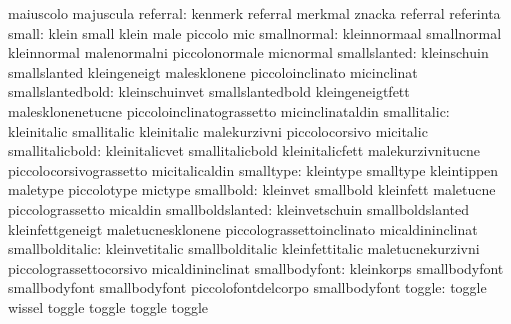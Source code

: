                           maiuscolo                 majuscula
                 referral: kenmerk                   referral
                           merkmal                   znacka
                           referral                  referinta
                    small: klein                     small
                           klein                     male
                           piccolo                   mic
              smallnormal: kleinnormaal              smallnormal
                           kleinnormal               malenormalni
                           piccolonormale            micnormal
             smallslanted: kleinschuin               smallslanted
                           kleingeneigt              malesklonene
                           piccoloinclinato          micinclinat
         smallslantedbold: kleinschuinvet            smallslantedbold
                           kleingeneigtfett          malesklonenetucne
                           piccoloinclinatograssetto micinclinataldin
              smallitalic: kleinitalic               smallitalic
                           kleinitalic               malekurzivni
                           piccolocorsivo            micitalic
          smallitalicbold: kleinitalicvet            smallitalicbold
                           kleinitalicfett           malekurzivnitucne
                           piccolocorsivograssetto   micitalicaldin
                smalltype: kleintype                 smalltype
                           kleintippen               maletype
                           piccolotype               mictype
                smallbold: kleinvet                  smallbold
                           kleinfett                 maletucne
                           piccolograssetto          micaldin
         smallboldslanted: kleinvetschuin            smallboldslanted
                           kleinfettgeneigt          maletucnesklonene
                           piccolograssettoinclinato micaldininclinat
          smallbolditalic: kleinvetitalic            smallbolditalic
                           kleinfettitalic           maletucnekurzivni
                           piccolograssettocorsivo   micaldininclinat
            smallbodyfont: kleinkorps                smallbodyfont
                           smallbodyfont             smallbodyfont
                           piccolofontdelcorpo       smallbodyfont %
                   toggle: toggle                    wissel
                           toggle                    toggle
                           toggle                    toggle
